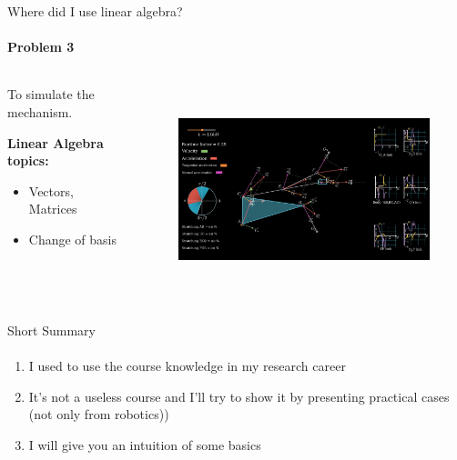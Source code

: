 \documentclass[aspectratio=169,notes]{beamer}
\begin{document}
\begin{frame}[t]{Where did I use linear algebra?}
    \framesubtitle{Problem 3}
    \vspace{-0.3cm}
    \begin{columns}[T,onlytextwidth]
        \begin{column}{0.34\textwidth}
            To simulate the mechanism. \medskip

            \textbf{Linear Algebra topics:}
            \begin{itemize}
                \item Vectors, Matrices
                \item Change of basis
            \end{itemize}
        \end{column}
        \begin{column}{0.64\textwidth}
            \vspace{-0.4cm}
            \begin{figure}[H]
                \href{https://drive.google.com/file/d/1vQFNiLfshH4hhh-Kb0mHS-fJaC5o_RsH/view}{
                    \centering\includegraphics[height=6cm,width=1\textwidth,keepaspectratio]{resources/doc.jpg}}
                \label{fig:resources/doc.jpg}
            \end{figure}
        \end{column}
    \end{columns}
\end{frame}

\begin{frame}[t]{Short Summary}
    \framesubtitle{}
    \begin{enumerate}
        \item I used to use the course knowledge in my research career
        \item It's not a useless course and I'll try to show it by presenting practical cases (not only from robotics))
        \item I will give you an intuition of some basics
    \end{enumerate}
\end{frame}
\end{document}
